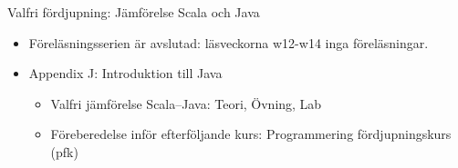 

\ifkompendium\else
\begin{SlideExtra}{Valfri fördjupning: Jämförelse Scala och Java}
\begin{itemize}
  \item Föreläsningsserien är avslutad: läsveckorna w12-w14 inga föreläsningar.
  \item Appendix J: Introduktion till Java 
  \begin{itemize}
    \item Valfri jämförelse Scala--Java: Teori, Övning, Lab
    \item Föreberedelse inför efterföljande kurs: Programmering fördjupningskurs (pfk)
  \end{itemize}
\end{itemize}
\end{SlideExtra}
\fi 








